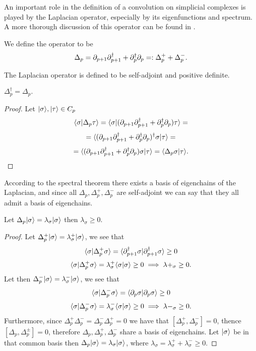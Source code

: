 \documentclass[../1.tex]{subfiles}
\begin{document}
    An important role in the definition of a convolution on simplicial complexes is played by the Laplacian operator,
    especially by its eigenfunctions and spectrum. A more thorough discussion of this operator can be found in \cite{laplacian}.
    
    \begin{defn}
        We define the  operator to be 
        \[ \Delta_p = \partial_{p+1}\partial^\dagger_{p+1} + \partial^\dagger_p\partial_p =: \Delta^+_p + \Delta^-_p.\]
    \end{defn}

    The Laplacian operator is defined to be self-adjoint and positive definite.

    \begin{prop}
        $\Delta^\dagger_p = \Delta_p.$
    \end{prop}
    \begin{proof}
        Let $| \sigma \rangle, | \tau \rangle \in C_p$ 
        \[ \langle \sigma | \Delta_p\tau \rangle=\langle \sigma | (\partial_{p+1}\partial^\dagger_{p+1} + \partial^\dagger_p\partial_p)\tau \rangle = \]
        \[ = \langle (\partial_{p+1}\partial^\dagger_{p+1} + \partial^\dagger_p\partial_p)^\dagger\sigma | \tau \rangle = \]
        \[ = \langle (\partial_{p+1}\partial^\dagger_{p+1} + \partial^\dagger_p\partial_p)\sigma | \tau \rangle = \langle \Delta_p\sigma | \tau \rangle. \]
    \end{proof}

    According to the spectral theorem there exists a basis of eigenchains of the Laplacian, and since all $\Delta_p, \Delta^+_p, \Delta^-_p$
    are self-adjoint we can say that they all admit a basis of eigenchains.

    \begin{prop}
        Let $\Delta_p| \sigma \rangle = \lambda_\sigma| \sigma \rangle$ then $\lambda_\sigma \geq 0$.
    \end{prop}
    \begin{proof}
        Let $\Delta^+_p| \sigma \rangle = \lambda^+_\sigma | \sigma \rangle$, we see that
        \[ \langle \sigma | \Delta^+_p\sigma \rangle = \langle \partial^\dagger_{p+1}\sigma | \partial^\dagger_{p+1}\sigma \rangle \geq 0 \]
        \[ \langle \sigma | \Delta^+_p\sigma \rangle = \lambda^+_\sigma\langle \sigma | \sigma \rangle \geq 0 \implies \lambda+_\sigma \geq 0.\]
        Let then $\Delta^-_p| \sigma \rangle = \lambda^-_\sigma | \sigma \rangle$, we see that
        \[ \langle \sigma | \Delta^-_p\sigma \rangle = \langle \partial_p\sigma | \partial_p\sigma \rangle \geq 0 \]
        \[ \langle \sigma | \Delta^-_p\sigma \rangle = \lambda^-_\sigma\langle \sigma | \sigma \rangle \geq 0 \implies \lambda-_\sigma \geq 0.\]
        Furthermore, since $\Delta^+_p\Delta^-_p = \Delta^-_p\Delta^+_p = 0$ we have that $[\Delta^+_p,\Delta^-_p] = 0$, thence
        $[\Delta_p, \Delta^\pm_p] = 0$, therefore $\Delta_p, \Delta^+_p, \Delta^-_p$ share a basis of eigenchains.
        Let $| \sigma \rangle$ be in that common basis then $\Delta_p| \sigma \rangle = \lambda_\sigma| \sigma \rangle$, where
        $\lambda_\sigma = \lambda^+_\sigma + \lambda^-_\sigma \geq 0$.
    \end{proof}
\end{document}
